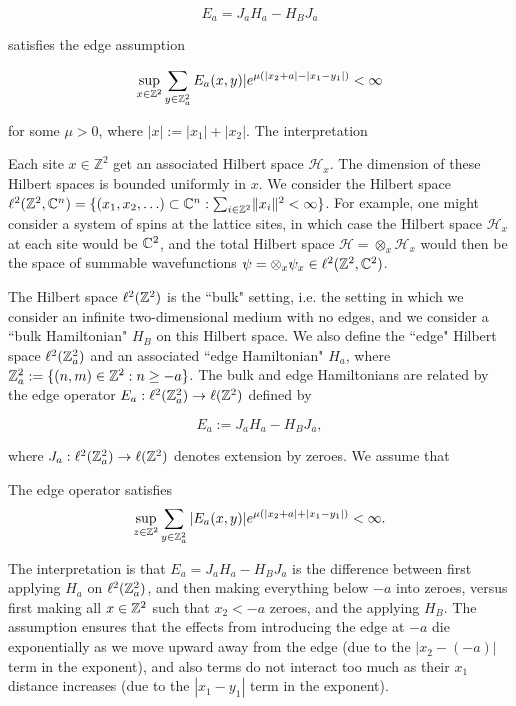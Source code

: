 \documentclass[12pt, letterpaper]{article}
\begin{document}
\[E_a = J_aH_a-H_BJ_a\]

satisfies the edge assumption

\[\sup_{x\in\mathbb{Z}^2}\sum_{y\in\mathbb{Z}^2_a} E_a(x,y)|e^{\mu(|x_2+a|-|x_1-y_1|)} < \infty\]

for some $\mu>0$, where $|x| := |x_1|+|x_2|$. The interpretation





Each site $x \in \mathbb{Z}^2$ get an associated Hilbert space $\mathcal{H}_x$. The dimension of these Hilbert spaces is bounded uniformly in $x$. We consider the Hilbert space $\ell^2(\mathbb{Z}^2, \mathbb{C}^n) = \{ (x_1,x_2,\ldots) \subset \mathbb{C}^n : \sum_{i \in \mathbb{Z}^2} \lVert x_i \rVert^2 < \infty\}$. For example, one might consider a system of spins at the lattice sites, in which case the Hilbert space $\mathcal{H}_x$ at each site would be $\mathbb{C}^2$, and the total Hilbert space $\mathcal{H} = \otimes_x \mathcal{H}_x$ would then be the space of summable wavefunctions $\psi = \otimes_x\psi_x \in \ell^2(\mathbb{Z}^2,\mathbb{C}^2)$.

The Hilbert space $\ell^2(\mathbb{Z}^2)$ is the ``bulk" setting, i.e. the setting in which we consider an infinite two-dimensional medium with no edges, and we consider a ``bulk Hamiltonian" $H_B$ on this Hilbert space. We also define the ``edge" Hilbert space $\ell^2(\mathbb{Z}_a^2)$ and an associated ``edge Hamiltonian" $H_a$, where $\mathbb{Z}^2_a := \{(n,m) \in \mathbb{Z}^2 : n \geq -a\}$. The bulk and edge Hamiltonians are related by the edge operator $E_a : \ell^2(\mathbb{Z}^2_a) \to \ell(\mathbb{Z}^2)$ defined by

\[E_a := J_aH_a - H_BJ_a,\]

where $J_a : \ell^2(\mathbb{Z}_a^2) \to \ell(\mathbb{Z}^2)$ denotes extension by zeroes. We assume that

\begin{assumption}
The edge operator satisfies
\[\sup_{z\in\mathbb{Z}^2}\sum_{y\in\mathbb{Z}^2_a} |E_a(x,y)| e^{\mu(|x_2 + a| + |x_1-y_1|)} < \infty.\]
\end{assumption}



The interpretation is that $E_a = J_aH_a - H_BJ_a$ is the difference between first applying $H_a$ on $\ell^2(\mathbb{Z}^2_a)$, and then making everything below $-a$ into zeroes, versus first making all $x \in \mathbb{Z}^2$ such that $x_2 < -a$ zeroes, and the applying $H_B$. The assumption ensures that the effects from introducing the edge at $-a$ die exponentially as we move upward away from the edge (due to the $|x_2 - (-a)|$ term in the exponent), and also terms do not interact too much as their $x_1$ distance increases (due to the $|x_1-y_1|$ term in the exponent).
\end{document}
